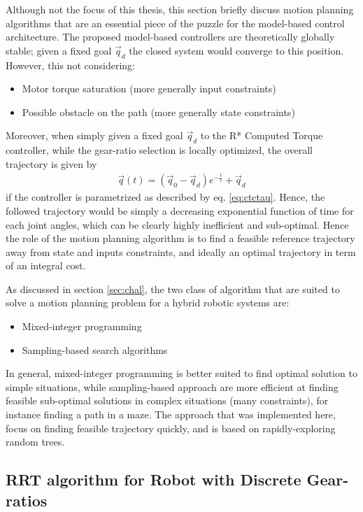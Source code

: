 Although not the focus of this thesis, this section briefly discuss motion planning algorithms that are an essential piece of the puzzle for the model-based control architecture. The proposed model-based controllers are theoretically globally stable; given a fixed goal $\vec{q}_d$ the closed system would converge to this position. However, this not considering:
%
\begin{itemize}
	\item Motor torque saturation (more generally input constraints)
	\item Possible obstacle on the path (more generally state constraints)
\end{itemize}
%
Moreover, when simply given a fixed goal $\vec{q}_d$ to the R* Computed Torque controller, while the gear-ratio selection is locally optimized, the overall trajectory is given by 
%
\begin{align}
\vec{q}(t)   = (\vec{q}_0 - \vec{q}_d)  e^{-\frac{t}{\tau}} + \vec{q}_d
\end{align}
%
if the controller is parametrized as described by eq. \eqref{eq:ctctau}. Hence, the followed trajectory would be simply a decreasing exponential function of time for each joint angles, which can be clearly highly inefficient and sub-optimal. Hence the role of the motion planning algorithm is to find a feasible reference trajectory away from state and inputs constraints, and ideally an optimal trajectory in term of an integral cost. 

As discussed in section \ref{sec:chal}, the two class of algorithm that are suited to solve a motion planning problem for a hybrid robotic systems are:
%
\begin{itemize}
	\item Mixed-integer programming
	\item Sampling-based search algorithms
\end{itemize}
%
In general, mixed-integer programming is better suited to find optimal solution to simple situations, while sampling-based approach are more efficient at finding feasible sub-optimal solutions in complex situations (many constraints), for instance finding a path in a maze. The approach that was implemented here, focus on finding feasible trajectory quickly, and is based on rapidly-exploring random trees.

\subsection{RRT algorithm for Robot with Discrete Gear-ratios}

